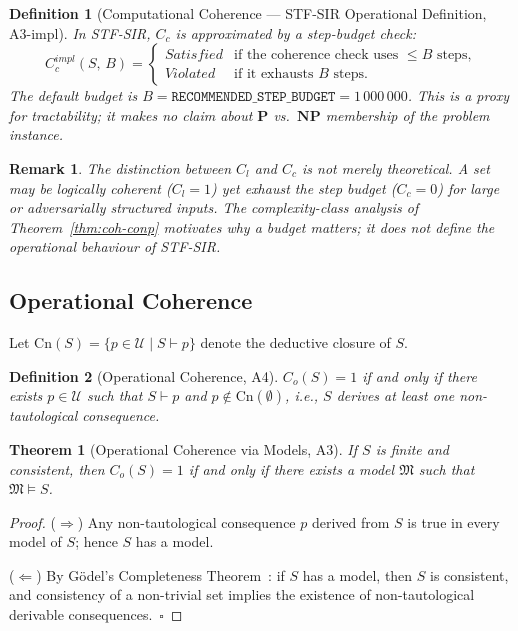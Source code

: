 \documentclass{article}
\newcommand{\Univ}{\mathcal{U}}
\newtheorem{theorem}{Theorem}
\newtheorem{definition}{Definition}
\newtheorem{remark}{Remark}
\begin{document}
\begin{definition}[Computational Coherence — STF-SIR Operational Definition, A3-impl]
\label{def:compcoh-impl}
In STF-SIR, $C_c$ is approximated by a step-budget check:
\[
  C_c^{\mathit{impl}}(S,\, B) =
  \begin{cases}
    \mathit{Satisfied} & \text{if the coherence check uses } \leq B \text{ steps,} \\
    \mathit{Violated}  & \text{if it exhausts } B \text{ steps.}
  \end{cases}
\]
The default budget is $B = \mathtt{RECOMMENDED\_STEP\_BUDGET} = 1\,000\,000$.
This is a proxy for tractability; it makes no claim about $\mathbf{P}$ vs.\
$\mathbf{NP}$ membership of the problem instance.
\end{definition}

\begin{remark}
The distinction between $C_l$ and $C_c$ is not merely theoretical.  A set may
be logically coherent ($C_l = 1$) yet exhaust the step budget ($C_c = 0$) for
large or adversarially structured inputs.  The complexity-class analysis of
Theorem~\ref{thm:coh-conp} motivates \emph{why} a budget matters; it does not
define the operational behaviour of STF-SIR.
\end{remark}

\subsection{Operational Coherence}
\label{app:op-coh}

Let $\mathrm{Cn}(S) = \{p \in \Univ \mid S \vdash p\}$ denote the deductive
closure of $S$.

\begin{definition}[Operational Coherence, A4]
$C_o(S) = 1$ if and only if there exists $p \in \Univ$ such that
$S \vdash p$ and $p \notin \mathrm{Cn}(\emptyset)$, i.e., $S$ derives at
least one non-tautological consequence.
\end{definition}

\begin{theorem}[Operational Coherence via Models, A3]
\label{thm:op-sat}
If $S$ is finite and consistent, then $C_o(S) = 1$ if and only if there exists
a model $\mathfrak{M}$ such that $\mathfrak{M} \models S$.
\end{theorem}

\begin{proof}
($\Rightarrow$) Any non-tautological consequence $p$ derived from $S$ is true
in every model of $S$; hence $S$ has a model.

($\Leftarrow$) By G\"{o}del's Completeness Theorem~\cite{godel1930}: if $S$
has a model, then $S$ is consistent, and consistency of a non-trivial set
implies the existence of non-tautological derivable consequences.~$\square$
\end{proof}
\end{document}

